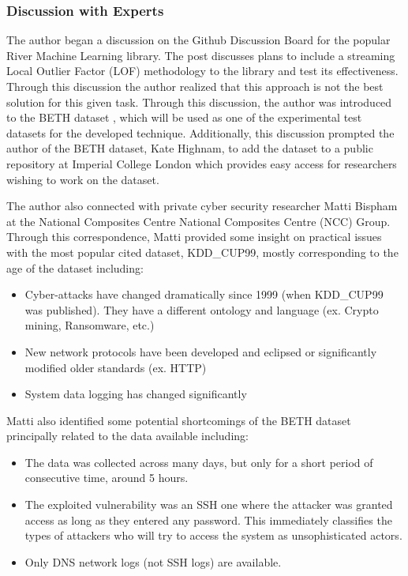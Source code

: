 \subsubsection{Discussion with Experts}

The author began a discussion on the Github Discussion Board \parencite{RiverGithub2022} for the popular River \parencite{2020river} Machine Learning library. The post discusses plans to include a streaming Local Outlier Factor (LOF) methodology to the library and test its effectiveness. Through this discussion the author realized that this approach is not the best solution for this given task. Through this discussion, the author was introduced to the BETH dataset \parencite{beth-dataset}, which will be used as one of the experimental test datasets for the developed technique. Additionally, this discussion prompted the author of the BETH dataset, Kate Highnam, to add the dataset to a public repository at Imperial College London which provides easy access for researchers wishing to work on the dataset.

The author also connected with private cyber security researcher Matti Bispham \parencite{Bispham-email:private} at the National Composites Centre National Composites Centre (NCC) Group. Through this correspondence, Matti provided some insight on practical issues with the most popular cited dataset, KDD\_CUP99, mostly corresponding to the age of the dataset including:

\begin{itemize}[leftmargin=2cm]
    \item Cyber-attacks have changed dramatically since 1999 (when KDD\_CUP99 was published). They have a different ontology and language (ex. Crypto mining, Ransomware, etc.)
    \item New network protocols have been developed and eclipsed or significantly modified older standards (ex. HTTP)
    \item System data logging has changed significantly
\end{itemize}

Matti also identified some potential shortcomings of the BETH dataset principally related to the data available including:

\begin{itemize}[leftmargin=2cm]
    \item The data was collected across many days, but only for a short period of consecutive time, around 5 hours.
    \item The exploited vulnerability was an SSH one where the attacker was granted access as long as they entered any password. This immediately classifies the types of attackers who will try to access the system as unsophisticated actors.
    \item Only DNS network logs (not SSH logs) are available.
\end{itemize}

